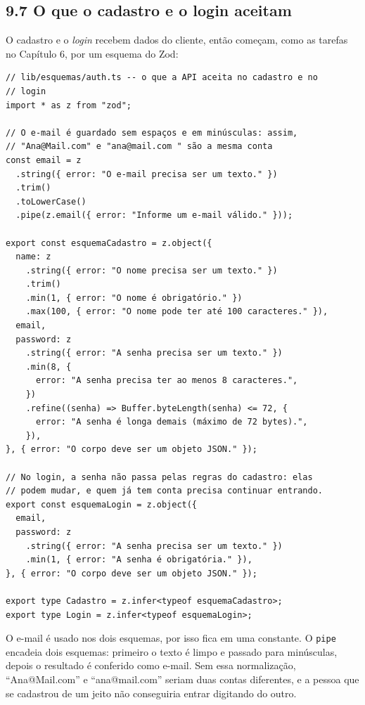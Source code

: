 \subsection{9.7 O que o cadastro e o login aceitam}

O cadastro e o \textit{login} recebem dados do cliente, então começam, como as tarefas no Capítulo 6, por um esquema do Zod:

\begin{codigo}
\begin{Verbatim}[breaklines=true, breaksymbolleft={}, fontsize=\footnotesize]
// lib/esquemas/auth.ts -- o que a API aceita no cadastro e no
// login
import * as z from "zod";

// O e-mail é guardado sem espaços e em minúsculas: assim,
// "Ana@Mail.com" e "ana@mail.com " são a mesma conta
const email = z
  .string({ error: "O e-mail precisa ser um texto." })
  .trim()
  .toLowerCase()
  .pipe(z.email({ error: "Informe um e-mail válido." }));

export const esquemaCadastro = z.object({
  name: z
    .string({ error: "O nome precisa ser um texto." })
    .trim()
    .min(1, { error: "O nome é obrigatório." })
    .max(100, { error: "O nome pode ter até 100 caracteres." }),
  email,
  password: z
    .string({ error: "A senha precisa ser um texto." })
    .min(8, {
      error: "A senha precisa ter ao menos 8 caracteres.",
    })
    .refine((senha) => Buffer.byteLength(senha) <= 72, {
      error: "A senha é longa demais (máximo de 72 bytes).",
    }),
}, { error: "O corpo deve ser um objeto JSON." });

// No login, a senha não passa pelas regras do cadastro: elas
// podem mudar, e quem já tem conta precisa continuar entrando.
export const esquemaLogin = z.object({
  email,
  password: z
    .string({ error: "A senha precisa ser um texto." })
    .min(1, { error: "A senha é obrigatória." }),
}, { error: "O corpo deve ser um objeto JSON." });

export type Cadastro = z.infer<typeof esquemaCadastro>;
export type Login = z.infer<typeof esquemaLogin>;
\end{Verbatim}
\end{codigo}

O e-mail é usado nos dois esquemas, por isso fica em uma constante. O \texttt{pipe} encadeia dois esquemas: primeiro o texto é limpo e passado para minúsculas, depois o resultado é conferido como e-mail. Sem essa normalização, ``Ana@Mail.com'' e ``ana@mail.com'' seriam duas contas diferentes, e a pessoa que se cadastrou de um jeito não conseguiria entrar digitando do outro.

